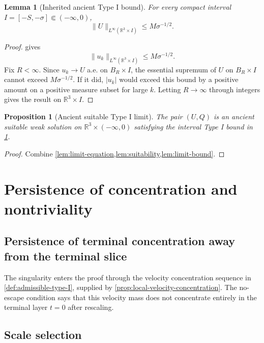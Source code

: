 \documentclass[11pt]{amsart}
\theoremstyle{plain}
\newtheorem{proposition}[theorem]{Proposition}
\newtheorem{lemma}[theorem]{Lemma}
\theoremstyle{definition}
\theoremstyle{remark}
\numberwithin{equation}{section}
\newcommand{\R}{\mathbb R}
\begin{document}
\begin{lemma}[Inherited ancient Type I bound]\label{lem:limit-bound}
For every compact interval \(I=[-S,-\sigma]\Subset(-\infty,0)\),
\[
   \|U\|_{L^\infty(\R^3\times I)}\le M\sigma^{-1/2}.
\]
\end{lemma}

\begin{proof}
 gives
\[
   \|u_k\|_{L^\infty(\R^3\times I)}\le M\sigma^{-1/2}.
\]
Fix \(R<\infty\).  Since \(u_k\to U\) a.e. on \(B_R\times I\), the essential
supremum of \(U\) on \(B_R\times I\) cannot exceed \(M\sigma^{-1/2}\).  If it
did, \(|u_k|\) would exceed this bound by a positive amount on a positive
measure subset for large \(k\).  Letting \(R\to\infty\) through integers gives
the result on \(\R^3\times I\).
\end{proof}

\begin{proposition}[Ancient suitable Type I limit]\label{prop:ancient-limit}
The pair \((U,Q)\) is an ancient suitable weak solution on
\(\R^3\times(-\infty,0)\) satisfying the interval Type I bound in
\cref{lem:limit-bound}.
\end{proposition}

\begin{proof}
Combine \cref{lem:limit-equation,lem:suitability,lem:limit-bound}.
\end{proof}

\section{Persistence of concentration and nontriviality}
\label{sec:nontriviality}

\subsection{Persistence of terminal concentration away from the terminal slice}

The singularity enters the proof through the velocity concentration sequence in
\cref{def:admissible-type-I}, supplied by
\cref{prop:local-velocity-concentration}.  The no-escape condition says that
this velocity mass does not concentrate entirely in the terminal layer \(t=0\)
after rescaling.

\subsection{Scale selection}
\end{document}
